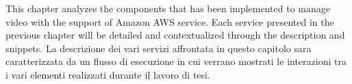 This chapter analyzes the components that has been implemented to manage video with the support of Amazon AWS service.
Each service presented in the previous chapter will be detailed and contextualized through the description and snippets. 
La descrizione dei vari servizi affrontata in questo capitolo sara caratterizzata da un flusso di esecuzione in cui verrano mostrati le interazioni tra i vari elementi realizzati durante il lavoro di tesi.
